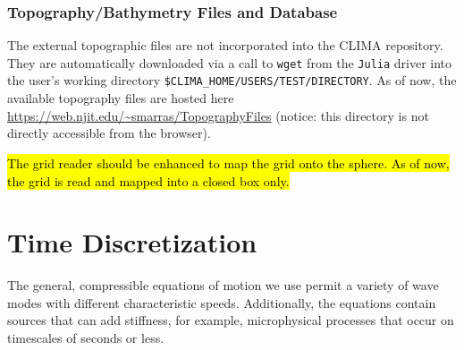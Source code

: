 \documentclass{report}
\begin{document}
\subsection{Topography/Bathymetry Files and Database}
The external topographic files are not incorporated into the CLIMA repository. 
They are automatically downloaded via a call to {\tt wget} from the {\tt Julia} driver into the user's working directory {\tt \$CLIMA\_HOME/USERS/TEST/DIRECTORY}. As of now, the available topography files are hosted here \url{https://web.njit.edu/~smarras/TopographyFiles} (notice: this directory is not directly accessible from the browser).

\hl{The grid reader should be enhanced to map the grid onto the sphere. As of now, the grid is read and mapped into a closed box only.}


\chapter{Time Discretization}\label{s:timestepping}

The general, compressible equations of motion we use permit a variety of wave modes with different characteristic speeds. Additionally, the equations contain sources that can add stiffness, for example, microphysical processes that occur on timescales of seconds or less.
\end{document}
